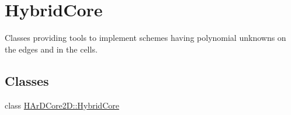\hypertarget{group__HybridCore}{}\section{Hybrid\+Core}
\label{group__HybridCore}


Classes providing tools to implement schemes having polynomial unknowns on the edges and in the cells.  


\subsection*{Classes}
\begin{DoxyCompactItemize}
\item 
class \hyperlink{classHArDCore2D_1_1HybridCore}{H\+Ar\+D\+Core2\+D\+::\+Hybrid\+Core}
\end{DoxyCompactItemize}
